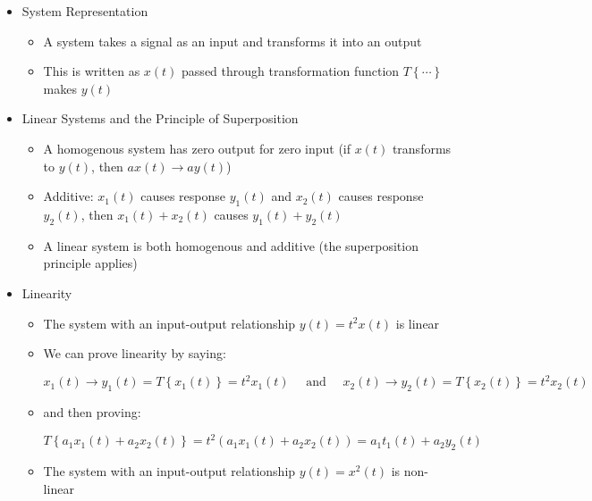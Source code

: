 \begin{itemize}

  \item System Representation

    \begin{itemize}

      \item A system takes a signal as an input and transforms it into an output

      \item This is written as $x(t)$ passed through transformation function $T\left\{ \cdots \right\}$ makes $y(t)$

    \end{itemize}

  \item Linear Systems and the Principle of Superposition

    \begin{itemize}

      \item A homogenous system has zero output for zero input (if $x(t)$ transforms to $y(t)$, then $ax(t)\to ay(t)$)

      \item Additive: $x_1(t)$ causes response $y_1(t)$ and $x_2(t)$ causes response $y_2(t)$, then $x_1(t)+x_2(t)$ causes $y_1(t)+y_2(t)$

      \item A linear system is both homogenous and additive (the superposition principle applies)

    \end{itemize}

  \item Linearity

    \begin{itemize}

      \item The system with an input-output relationship $y(t)=t^2x(t)$ is linear

      \item We can prove linearity by saying:

        $$x_1(t)\to y_1(t)=T\left\{ x_1(t) \right\}=t^2x_1(t)\quad\text{ and }\quad x_2(t)\to y_2(t)=T\left\{ x_2(t) \right\}=t^2x_2(t)$$

      \item and then proving:

        $$T\left\{ a_1x_1(t)+a_2x_2(t) \right\}=t^2(a_1x_1(t)+a_2x_2(t))=a_1t_1(t)+a_2y_2(t)$$


      \item The system with an input-output relationship $y(t)=x^2(t)$ is non-linear

    \end{itemize}

\end{itemize}




